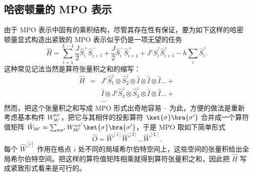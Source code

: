 \subsection{哈密顿量的 MPO 表示}
由于 MPO 表示中固有的乘积结构，尽管其存在性有保证，要为如下这样的哈密顿量显式构造出紧致的 MPO 表示似乎仍是一项无望的任务
\begin{equation}
\hat{H} = \sum_{i=1}^{L-1} \frac{J}{2}\hat{S}^+_i \hat{S}^-_{i+1} + \frac{J}{2}\hat{S}^-_i \hat{S}^+_{i+1} + J^z \hat{S}^z_i \hat{S}^z_{i+1} - h\sum_{i} \hat{S}^z_i .
\end{equation}
这种常见记法当然是算符张量积之和的缩写：
\begin{eqnarray*}
\hat{H} &=& J^z\hat{S}^z_1 \otimes \hat{S}^z_2 \otimes \hat{I} \otimes \hat{I} \otimes \hat{I} \ldots + \\
 & & \hat{I} \otimes J^z\hat{S}^z_2 \otimes \hat{S}^z_3 \otimes \hat{I} \otimes \hat{I} \ldots + \\
 & & \ldots
 \end{eqnarray*}
然而，把这个张量积之和写成 MPO 形式出奇地容易 \cite{McCulloch07} -- 为此，方便的做法是重新考虑基本构件 $W^{\sigma\sigma'}_{bb'}$，把它与其相伴的投影算符 $\ket{\sigma}\bra{\sigma'}$ 合并成一个算符值矩阵 $\hat{W}_{bb'} = \sum_{\sigma\sigma'} W^{\sigma\sigma'}_{bb'} \ket{\sigma}\bra{\sigma'}$，于是 MPO 取如下简单形式
\begin{equation}
\hat{O} = \hat{W}^{[1]}\hat{W}^{[2]} \ldots \hat{W}^{[L]} .
\end{equation}
每个 $\hat{W}^{[i]}$ 作用在格点 $i$ 处不同的局域希尔伯特空间上，这些空间的张量积给出全局希尔伯特空间。把这样的算符值矩阵相乘就得到算符张量积之和，因此把 $\hat{H}$ 写成紧致形式看来是可行的。

